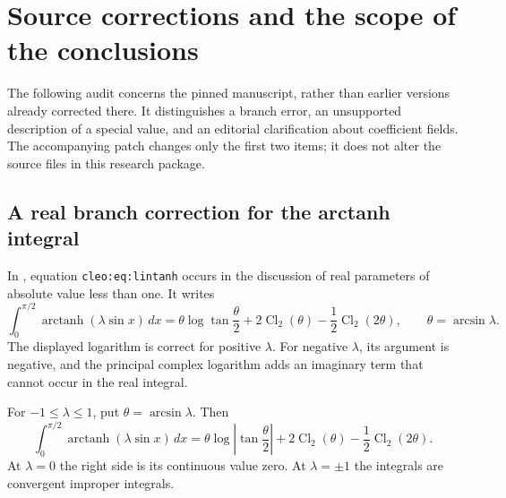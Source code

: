 \section{Source corrections and the scope of the conclusions}
\label{audit:sec:corrections}

The following audit concerns the pinned manuscript, rather than earlier
versions already corrected there.  It distinguishes a branch error, an
unsupported description of a special value, and an editorial clarification
about coefficient fields.  The accompanying patch changes only the first
two items; it does not alter the source files in this research package.

\subsection{A real branch correction for the arctanh integral}

In , equation
\texttt{cleo:eq:lintanh} occurs in the discussion of real parameters of
absolute value less than one.  It writes
\[
 \int_0^{\pi/2}\operatorname{arctanh}(\lambda\sin x)\,dx
 =\theta\log\tan\frac\theta2
       +2\operatorname{Cl}_2(\theta)
       -\frac12\operatorname{Cl}_2(2\theta),
 \qquad \theta=\arcsin\lambda.
\]
The displayed logarithm is correct for positive $\lambda$.  For negative
$\lambda$, its argument is negative, and the principal complex logarithm
adds an imaginary term that cannot occur in the real integral.

\begin{proposition}
\label{audit:prop:arctanh}
For $-1\le\lambda\le1$, put $\theta=\arcsin\lambda$.  Then
\begin{equation}
 \int_0^{\pi/2}\operatorname{arctanh}(\lambda\sin x)\,dx
 =\theta\log\left|\tan\frac\theta2\right|
       +2\operatorname{Cl}_2(\theta)
       -\frac12\operatorname{Cl}_2(2\theta).
 \label{audit:eq:arctanh-corrected}
\end{equation}
At $\lambda=0$ the right side is its continuous value zero.  At
$\lambda=\pm1$ the integrals are convergent improper integrals.
\end{proposition}

